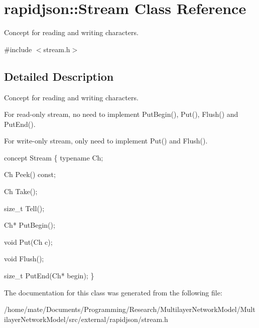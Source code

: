 \hypertarget{classrapidjson_1_1Stream}{}\section{rapidjson\+:\+:Stream Class Reference}
\label{classrapidjson_1_1Stream}


Concept for reading and writing characters.  




{\ttfamily \#include $<$stream.\+h$>$}



\subsection{Detailed Description}
Concept for reading and writing characters. 

For read-\/only stream, no need to implement Put\+Begin(), Put(), Flush() and Put\+End().

For write-\/only stream, only need to implement Put() and Flush().


\begin{DoxyCode}
concept Stream \{
    \textcolor{keyword}{typename} Ch;    

    Ch Peek() \textcolor{keyword}{const};

    Ch Take();

    \textcolor{keywordtype}{size\_t} Tell();

    Ch* PutBegin();

    \textcolor{keywordtype}{void} Put(Ch c);

    \textcolor{keywordtype}{void} Flush();

    \textcolor{keywordtype}{size\_t} PutEnd(Ch* begin);
\}
\end{DoxyCode}
 

The documentation for this class was generated from the following file\+:\begin{DoxyCompactItemize}
\item 
/home/mate/\+Documents/\+Programming/\+Research/\+Multilayer\+Network\+Model/\+Multilayer\+Network\+Model/src/external/rapidjson/stream.\+h\end{DoxyCompactItemize}
